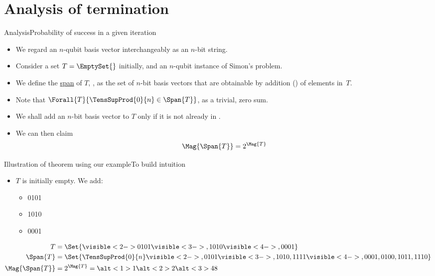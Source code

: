 \section*{Analysis of termination}

\begin{frame}{Analysis}{Probability of success in a given iteration}

\begin{itemize}
    \item We regard an $n$-qubit basis vector interchangeably as an $n$-bit string.
    \item Consider a set $T=\EmptySet{}$ initially, and an $n$-qubit instance of Simon's problem.
    \item We define the \href{https://en.wikipedia.org/wiki/Linear_span}{span} of $T$, , as the set of $n$-bit basis vectors that are obtainable by addition (\Xor{}{}) of elements in~$T$.  
    \item Note that $\Forall{T}{\TensSupProd{0}{n} \in \Span{T}}$, as a trivial, zero sum.
    \item We shall add an $n$-bit basis vector to $T$ only if it is not already in .
    \item We can then claim 
    \[\Mag{\Span{T}} = 2^\Mag{T}\]
\end{itemize}
    
\end{frame}

\begin{frame}{Illustration of theorem using our example}{To build intuition}
\begin{itemize}
    \item<1-> $T$ is initially empty.  We add:
    \begin{itemize}
    \item<2-> 0101
    \item<3-> 1010
    \item<4-> 0001
    \end{itemize}
\end{itemize}

\begin{align*}
T &= \Set{
\visible<2->{0101}
\visible<3->{, 1010}
\visible<4->{, 0001}
} \\
\Span{T} &= \Set{
\TensSupProd{0}{n}%
\visible<2->{, 0101}
\visible<3->{, 1010, 1111}
\visible<4->{, 0001, 0100, 1011, 1110}
} \\
\Mag{\Span{T}} &= 2^\Mag{T} = \alt<1>{1}{\alt<2>{2}{\alt<3>{4}{8}}}
\end{align*}

\end{frame}

